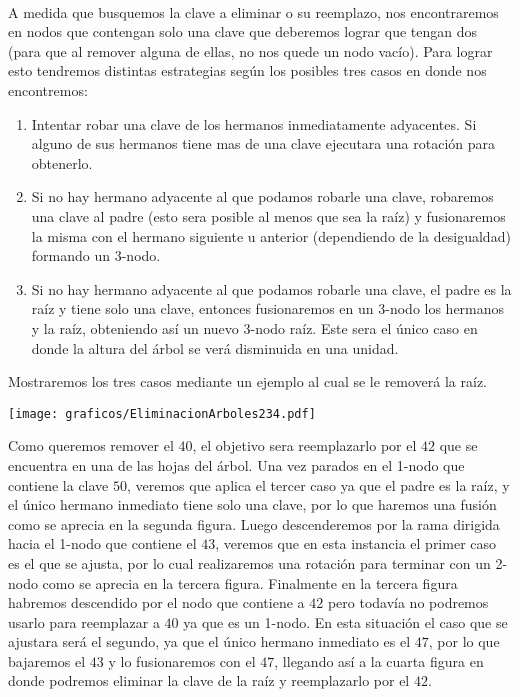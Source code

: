 ~

A medida que busquemos la clave a eliminar o su reemplazo, nos encontraremos en nodos que contengan solo una clave que deberemos lograr que tengan dos (para que al remover alguna de ellas, no nos quede un nodo vac\'io). Para lograr esto tendremos distintas estrategias seg\'un los posibles tres casos en donde nos encontremos:

\begin{enumerate}
 \item Intentar robar una clave de los hermanos inmediatamente adyacentes. Si alguno de sus hermanos tiene mas de una clave ejecutara una rotaci\'on para obtenerlo.
 \item Si no hay hermano adyacente al que podamos robarle una clave, robaremos una clave al padre (esto sera posible al menos que sea la ra\'iz) y fusionaremos la misma con el hermano siguiente u anterior (dependiendo de la desigualdad) formando un 3-nodo.
 \item Si no hay hermano adyacente al que podamos robarle una clave, el padre es la ra\'iz y tiene solo una clave, entonces fusionaremos en un 3-nodo los hermanos y la ra\'iz, obteniendo as\'i un nuevo 3-nodo ra\'iz. Este sera el \'unico caso en donde la altura del \'arbol se ver\'a disminuida en una unidad.
\end{enumerate}

Mostraremos los tres casos mediante un ejemplo al cual se le remover\'a la ra\'iz.

\begin{SCfigure}[1][ht!]
 \centering
 \texttt{[image: graficos/EliminacionArboles234.pdf]}
\end{SCfigure}

Como queremos remover el $40$, el objetivo sera reemplazarlo por el $42$ que se encuentra en una de las hojas del \'arbol. Una vez parados en el 1-nodo que contiene la clave $50$, veremos que aplica el tercer caso ya que el padre es la ra\'iz, y el \'unico hermano inmediato tiene solo una clave, por lo que haremos una fusi\'on como se aprecia en la segunda figura. Luego descenderemos por la rama dirigida hacia el 1-nodo que contiene el $43$, veremos que en esta instancia el primer caso es el que se ajusta, por lo cual realizaremos una rotaci\'on para terminar con un 2-nodo como se aprecia en la tercera figura. Finalmente en la tercera figura habremos descendido por el nodo que contiene a $42$ pero todav\'ia no podremos usarlo para reemplazar a $40$ ya que es un 1-nodo. En esta situaci\'on el caso que se ajustara ser\'a el segundo, ya que el \'unico hermano inmediato es el $47$, por lo que bajaremos el $43$ y lo fusionaremos con el $47$, llegando as\'i a la cuarta figura en donde podremos eliminar la clave de 
la ra\'iz y 
reemplazarlo por el $42$.

